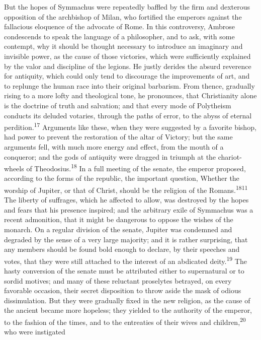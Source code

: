 But the hopes of Symmachus were repeatedly baffled by the firm
and dexterous opposition of the archbishop of Milan, who
fortified the emperors against the fallacious eloquence of the
advocate of Rome. In this controversy, Ambrose condescends to
speak the language of a philosopher, and to ask, with some
contempt, why it should be thought necessary to introduce an
imaginary and invisible power, as the cause of those victories,
which were sufficiently explained by the valor and discipline of
the legions. He justly derides the absurd reverence for
antiquity, which could only tend to discourage the improvements
of art, and to replunge the human race into their original
barbarism. From thence, gradually rising to a more lofty and
theological tone, he pronounces, that Christianity alone is the
doctrine of truth and salvation; and that every mode of
Polytheism conducts its deluded votaries, through the paths of
error, to the abyss of eternal perdition.\textsuperscript{17} Arguments like
these, when they were suggested by a favorite bishop, had power
to prevent the restoration of the altar of Victory; but the same
arguments fell, with much more energy and effect, from the mouth
of a conqueror; and the gods of antiquity were dragged in triumph
at the chariot-wheels of Theodosius.\textsuperscript{18} In a full meeting of the
senate, the emperor proposed, according to the forms of the
republic, the important question, Whether the worship of Jupiter,
or that of Christ, should be the religion of the Romans.\textsuperscript{1811} The
liberty of suffrages, which he affected to allow, was destroyed
by the hopes and fears that his presence inspired; and the
arbitrary exile of Symmachus was a recent admonition, that it
might be dangerous to oppose the wishes of the monarch. On a
regular division of the senate, Jupiter was condemned and
degraded by the sense of a very large majority; and it is rather
surprising, that any members should be found bold enough to
declare, by their speeches and votes, that they were still
attached to the interest of an abdicated deity.\textsuperscript{19} The hasty
conversion of the senate must be attributed either to
supernatural or to sordid motives; and many of these reluctant
proselytes betrayed, on every favorable occasion, their secret
disposition to throw aside the mask of odious dissimulation. But
they were gradually fixed in the new religion, as the cause of
the ancient became more hopeless; they yielded to the authority
of the emperor, to the fashion of the times, and to the
entreaties of their wives and children,\textsuperscript{20} who were instigated
